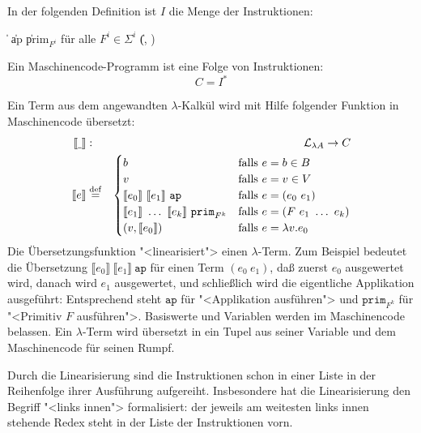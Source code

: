 \begin{definition}[Maschinencode]\label{def:secd-code}
  In der folgenden Definition ist $I$ die Menge der Instruktionen:
  \begin{grammar}
     \: 
    \> \| 
    \> \| ap
    \> \| prim$_{F^i}$ \textrm{für alle $F^i \in \Sigma^i$}
    \> \| (, )
  \end{grammar}
  Ein Maschinencode-Programm ist eine Folge von Instruktionen:
  \begin{displaymath}
    C = I^\ast
  \end{displaymath}
\end{definition}

Ein Term aus dem angewandten $\lambda$-Kalkül wird mit Hilfe folgender
Funktion in Maschinencode übersetzt:
%
\begin{eqnarray*}
  \llbracket \underline{~} \rrbracket &:& \mathcal{L}_{\lambda{}A}
  \rightarrow C\\
  \llbracket e \rrbracket &\stackrel{\rm def}{=}&
  \begin{cases}
    b & \textrm{falls $e = b \in B$}\\
    v & \textrm{falls $e = v \in V$}\\
    \llbracket e_0\rrbracket~\llbracket e_1\rrbracket~\mathtt{ap}
    & \textrm{falls $e = (e_0~e_1)$}\\
    \llbracket e_1\rrbracket~\ldots~\llbracket e_k\rrbracket~\mathtt{prim}_{F^k}
    & \textrm{falls $e = (F~e_1~\ldots~e_k)$}\\
    (v, \llbracket e_0\rrbracket) & \textrm{falls $e = \lambda v.e_0$}
  \end{cases}
\end{eqnarray*}
%
Die Übersetzungsfunktion "<linearisiert"> einen $\lambda$-Term.  Zum
Beispiel bedeutet die Übersetzung $\llbracket e_0\rrbracket~\llbracket
e_1\rrbracket~\mathtt{ap}$ für einen Term $(e_0~e_1)$, daß zuerst
$e_0$ ausgewertet wird, danach wird $e_1$ ausgewertet, und schließlich wird die
eigentliche Applikation ausgeführt:  Entsprechend steht $\mathtt{ap}$
für "<Applikation ausführen"> und $\mathtt{prim}_{F^k}$ für "<Primitiv
$F$ ausführen">.  Basiswerte und Variablen werden im Maschinencode
belassen.  Ein $\lambda$-Term wird übersetzt in ein Tupel aus seiner
Variable und dem Maschinencode für seinen Rumpf.

Durch die Linearisierung sind die Instruktionen schon in einer Liste in der
Reihenfolge ihrer Ausführung aufgereiht.  Insbesondere hat die
Linearisierung den Begriff "<links innen"> formalisiert: der jeweils
am weitesten links innen stehende Redex steht in der Liste der
Instruktionen vorn.

